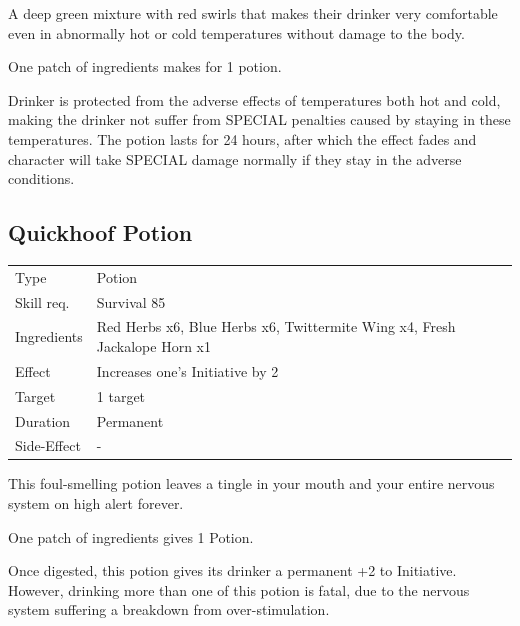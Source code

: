 \documentclass[11pt,a4paper,twocolumn]{book}
\begin{document}
\medskip

A deep green mixture with red swirls that makes their drinker very comfortable even in abnormally hot or cold temperatures without damage to the body.

One patch of ingredients makes for 1 potion.

Drinker is protected from the adverse effects of temperatures both hot and cold, making the drinker not suffer from SPECIAL penalties caused by staying in these temperatures. The potion lasts for 24 hours, after which the effect fades and character will take SPECIAL damage normally if they stay in the adverse conditions.


\subsection*{Quickhoof Potion}
{
	\begin{tabu} to 75mm{| X[l,4] | X[l,8] |}
		\hline
		Type 			& Potion 																				\\
        Skill req.	    & Survival 85 																			\\
        Ingredients     & Red Herbs x6, Blue Herbs x6, Twittermite Wing x4, Fresh Jackalope Horn x1				\\
        Effect     		& Increases one's Initiative by 2 														\\
        Target      	& 1 target																				\\
        Duration  		& Permanent	 																			\\
        Side-Effect     & -																						\\ \hline
	\end{tabu}
		
}

\medskip

This foul-smelling potion leaves a tingle in your mouth and your entire nervous system on high alert forever.

One patch of ingredients gives 1 Potion.

Once digested, this potion gives its drinker a permanent +2 to Initiative. However, drinking more than one of this potion is fatal, due to the nervous system suffering a breakdown from over-stimulation.
\end{document}
